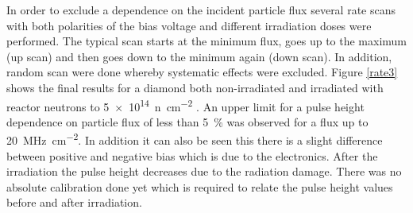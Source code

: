 
In order to exclude a dependence on the incident particle flux several rate scans with both polarities of the bias voltage and different irradiation doses were performed. The typical scan starts at the minimum flux, goes up to the maximum (up scan) and then goes down to the minimum again (down scan). In addition, random scan were done whereby systematic effects were excluded. Figure \vref{rate3} shows the final results for a \pcvd diamond both non-irradiated and irradiated with reactor neutrons to \SI{5e14}{n\per \centi\meter^2} . An upper limit for a pulse height dependence on particle flux of less than \SI{5}{\%} was observed for a flux up to \SI{20}{\mega\hertz\per cm^2}. In addition it can also be seen this there is a slight difference between positive and negative bias which is due to the electronics. After the irradiation the pulse height decreases due to the radiation damage. There was no absolute calibration done yet which is required to relate the pulse height values before and after irradiation.

